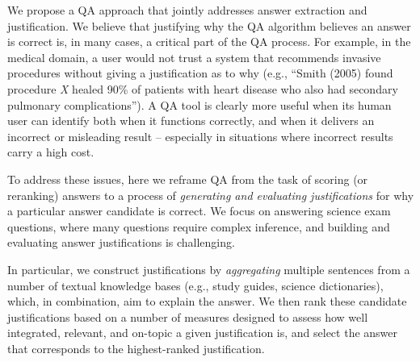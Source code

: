 


We propose a QA approach that jointly addresses answer extraction and justification.
We believe that justifying why the QA algorithm believes an answer is correct is, in many cases, a critical part of the QA process.
For example, in the medical domain, a user would not trust a system that recommends invasive procedures without giving a justification as to why (e.g., ``Smith (2005) found procedure \emph{X} healed 90\% of patients with heart disease who also had secondary pulmonary complications'').  A QA tool is clearly more useful when its human user can identify both when it functions correctly, and when it delivers an incorrect or misleading result -- especially in situations where incorrect results carry a high cost.  



To address these issues, here we reframe QA from the task of scoring (or reranking) answers to 
a process of \emph{generating and evaluating justifications} for why a particular answer candidate is correct. 
We focus on answering science exam questions, where many questions require complex inference, and building and evaluating answer justifications is challenging. 

\address{To get a complete and valid explanation for selection of answer choice, may need to aggregate info from multiple distinct resources}

\address{For aggregation, to prevent semantic drift, use structured representations (parts of CL2017)}
In particular, we construct justifications by {\em aggregating} multiple sentences from a number of textual knowledge bases (e.g., study guides, science dictionaries), which, in combination, aim to explain the answer.
We then rank these candidate justifications based on a number of measures designed to assess how well integrated, relevant, and on-topic a given justification is, and select the answer that corresponds to the highest-ranked justification.










